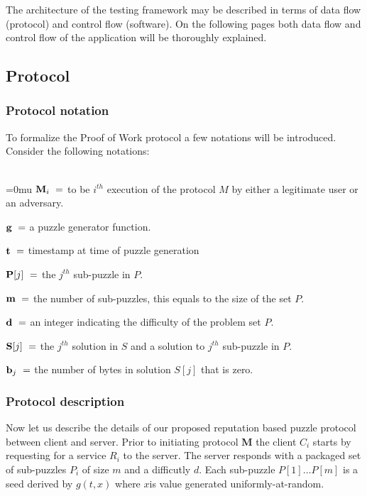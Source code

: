 The architecture of the testing framework may be described in terms of data flow (protocol) and control flow (software). On the following pages both data flow and control flow of the application will be thoroughly explained.

\subsection{Protocol}

\subsubsection{Protocol notation}
To formalize the Proof of Work protocol a few notations will be introduced. Consider the following notations:
\\
\\
\indent \begin{minipage}{0.9\linewidth}
\thickmuskip=0mu
${\textbf M_i} \ = $ to be $i^{th}$ execution of the protocol $M$ by either a legitimate user or an adversary. 

${\textbf g} \ = $ a puzzle generator function.

${\textbf t} \ = $ timestamp at time of puzzle generation

${\textbf P[j]} \ = $ the $j^{th}$ sub-puzzle in $P$.

${\textbf m} \ = $ the number of sub-puzzles, this equals to the size of the set $P$. 

${\textbf d} \ = $ an integer indicating the difficulty of the problem set $P$. 

${\textbf S[j]} \ = $ the $j^{th}$ solution in $S$ and a solution to $j^{th}$ sub-puzzle in $P$. 

${\textbf b_j} \ = $ the number of bytes in solution $S[j]$ that is zero. 
\end{minipage}


\subsubsection{Protocol description}\label{text:protodesc}
Now let us describe the details of our proposed reputation based puzzle protocol between client and server. Prior to initiating protocol \textbf{M} the client $C_i$ starts by requesting for a service $R_i$ to the server. The server responds with a packaged set of sub-puzzles $P_i$ of size $m$ and a difficutly $d$. Each sub-puzzle $P[1] \dots P[m]$ is a seed derived by $g(t,x)$ where $x$is value generated uniformly-at-random.

